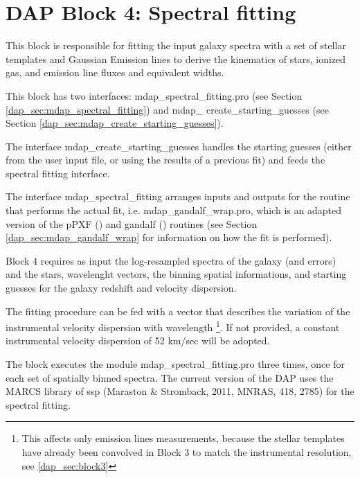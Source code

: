 \documentclass[11pt]{book}
\begin{document}


\section[DAP Block 4: Spectral fitting]{DAP Block 4: Spectral fitting}

This block is responsible for fitting the input galaxy spectra with a
set of stellar templates and Gaussian Emission lines to derive the
kinematics of stars, ionized gas, and emission line fluxes and
equivalent widths.

This block has two interfaces: mdap\_spectral\_fitting.pro (see
Section \ref{dap_sec:mdap_spectral_fitting}) and
mdap\_ create\_starting\_guesses (see Section
\ref{dap_sec:mdap_create_starting_guesses}).


The interface mdap\_create\_starting\_guesses handles the starting
guesses (either from the user input file, or using the results of a
previous fit) and feeds the spectral fitting interface.


The interface mdap\_spectral\_fitting arranges inputs and outputs for
the routine that performs the actual fit, i.e.
mdap\_gandalf\_wrap.pro, which is an adapted version of the pPXF
(\citealt{Cappellari+04}) and gandalf (\citealt{Sarzi+06}) routines
(see Section \ref{dap_sec:mdap_gandalf_wrap} for information on how
the fit is performed). 

Block 4 requires as input the log-resampled spectra of the galaxy (and
errors) and the stars, wavelenght vectors, the binning spatial
informations, and starting guesses for the galaxy redshift and
velocity dispersion.

The fitting procedure can be fed with a vector that describes the
variation of the instrumental velocity dispersion with
wavelength \footnote{This affects only emission lines measurements,
  because the stellar templates have already been convolved in Block 3
  to match the instrumental resolution, see \ref{dap_sec:block3}}. If
not provided, a constant instrumental velocity dispersion of 52 km/sec
will be adopted.

The block executes the module mdap\_spectral\_fitting.pro three times,
once for each set of spatially binned spectra.  The current version of
the DAP uses the MARCS library of ssp  (Maraston \& Stromback,
2011, MNRAS, 418, 2785) for the spectral fitting.
\end{document}
